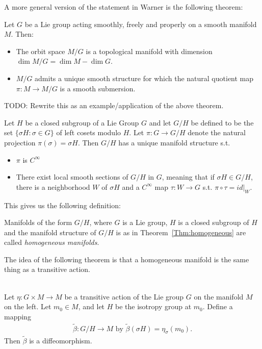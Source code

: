 A more general version of the statement in Warner is the following theorem:
\begin{theorem}
\label{thm:quotient by group action}
Let $G$ be a Lie group acting smoothly, freely and properly on a smooth manifold $M$. Then:
\begin{itemize}
\item The orbit space $M/G$ is a topological manifold with dimension $\dim M/G = \dim M - \dim G$.
\item $M/G$ admits a unique smooth structure for which the natural quotient map $\pi \colon M \to M/G$ is a smooth submersion.
\end{itemize}
\end{theorem}


\begin{example}\label{Thm:homogeneous}
\textup{\cite[3.58]{Warner1983}}
TODO: Rewrite this as an example/application of the above theorem.

Let $H$ be a closed subgroup of a Lie Group $G$ and let $G/H$ be defined to be the set $\{\sigma H \colon \sigma \in G\}$ of left cosets modulo $H$. Let $\pi \colon G \to G/H$ denote the natural projection $\pi(\sigma) = \sigma H$. Then $G/H$ has a unique manifold structure s.t.
\begin{itemize}
\item $\pi$ is $C^{\infty}$
\item There exist local smooth sections of $G/H$ in $G$, meaning that if $\sigma H \in G/H$, there is a neighborhood $W$ of $\sigma H$ and a $C^{\infty}$ map $\tau \colon W \to G$ s.t. $\pi \circ \tau = id\vert_W$.
\end{itemize}
\end{example}


This gives us the following definition:
\begin{definition} 
\textup{\cite[3.59]{Warner1983}}
Manifolds of the form $G/H$, where $G$ is a Lie group, $H$ is a closed subgroup of $H$ and the manifold structure of $G/H$ is as in Theorem~\ref{Thm:homogeneous} are called \emph{homogeneous manifolds}.
\end{definition}

The idea of the following theorem is that a homogeneous manifold is the same thing as a transitive action.

\begin{theorem}
\label{thm:transitive action homogeneous manifold}
\textup{\cite[3.62]{Warner1983}}\\
Let $\eta \colon G \times M \to M$ be a transitive action of the Lie group $G$ on the manifold $M$ on the left. Let $m_0 \in M$, and let $H$ be the isotropy group at $m_0$. Define a mapping
\begin{align*}
\tilde{\beta} \colon G/H \to M \text{ by } \tilde{\beta}(\sigma H) = \eta_{\sigma}(m_0).
\end{align*}
Then $\tilde{\beta}$ is a diffeomorphism.
\end{theorem}

